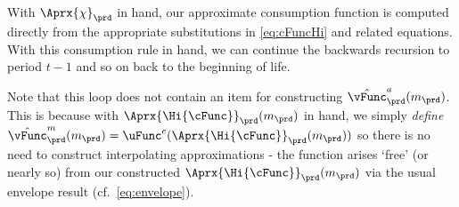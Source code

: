 With $\Aprx{\chi}_{\prd}$ in hand, our approximate consumption function
is computed directly from the appropriate substitutions in \eqref{eq:cFuncHi}
and related equations.  With this consumption
rule in hand, we can continue the backwards recursion to period $t-1$
and so on back to the beginning of life.

Note that this loop does not contain an item for constructing $\hat{\vFunc}_{\prd}^{{a}}({m}_{\prd})$. This is because with $\Aprx{\Hi{\cFunc}}_{\prd}({m}_{\prd})$ in hand, we simply \textit{define} $\hat{\vFunc}^{{m}}_{\prd}({m}_{\prd}) = \uFunc^{{c}}(\Aprx{\Hi{\cFunc}}_{\prd}({m}_{\prd}))$ so there is no need to construct interpolating approximations - the function arises `free' (or nearly so) from our constructed $\Aprx{\Hi{\cFunc}}_{\prd}({m}_{\prd})$ via the usual envelope result (cf.\ \eqref{eq:envelope}).

